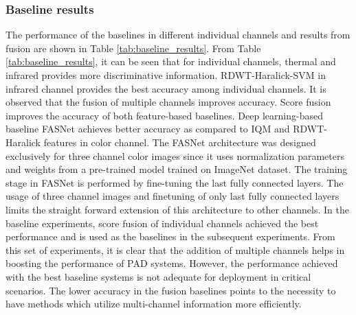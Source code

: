\documentclass[journal]{IEEEtran}
\begin{document}
\subsubsection{Baseline results}
The performance of the baselines in different individual channels and results from fusion are shown in Table \ref{tab:baseline_results}. From Table \ref{tab:baseline_results}, it can be seen that for individual channels, thermal and infrared provides
more discriminative information. RDWT-Haralick-SVM in infrared channel provides the best accuracy among individual channels. 
It is observed that the fusion of multiple channels improves accuracy. Score fusion improves the accuracy of both feature-based baselines. Deep learning-based baseline FASNet achieves better accuracy as compared to IQM and RDWT-Haralick features in color channel. The FASNet architecture was designed exclusively for three channel color images since it uses normalization parameters and weights from a pre-trained model trained on ImageNet \cite{ILSVRC15} dataset. The training stage in FASNet is performed by fine-tuning the last fully connected layers. The usage of three channel images and finetuning of only last fully connected layers limits the straight forward extension of this architecture to other channels. In the baseline experiments, score fusion of individual channels achieved the best performance and is used as the baselines in the subsequent experiments. From this set of experiments, it is clear that the addition of multiple channels helps in boosting the performance of PAD systems. However, the performance achieved with the best baseline systems is not adequate for deployment in critical scenarios. The lower accuracy in the fusion baselines points to the necessity to have methods which utilize multi-channel information more efficiently.
\end{document}
